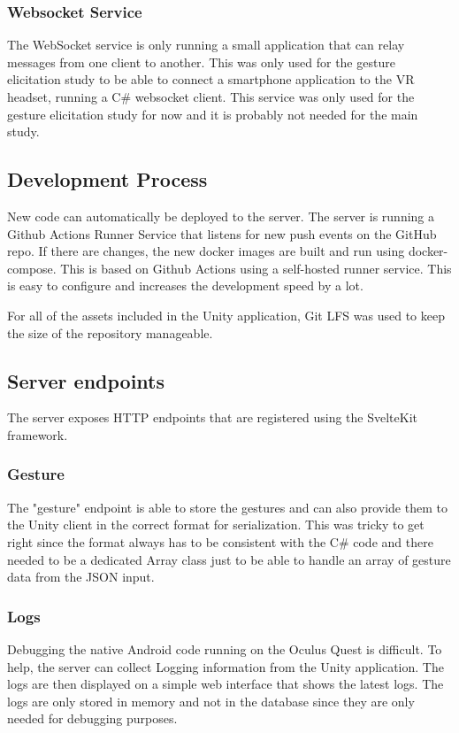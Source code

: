 \subsubsection{Websocket Service}
The WebSocket service is only running a small application that can relay messages from one client to another. This was only used for the gesture elicitation study to be able to connect a smartphone application to the VR headset, running a C\# websocket client. This service was only used for the gesture elicitation study for now and it is probably not needed for the main study.


\subsection{Development Process}
New code can automatically be deployed to the server. The server is running a Github Actions Runner Service that listens for new push events on the GitHub repo. If there are changes, the new docker images are built and run using docker-compose. This is based on Github Actions using a self-hosted runner service. This is easy to configure and increases the development speed by a lot. 

For all of the assets included in the Unity application, Git LFS was used to keep the size of the repository manageable.


\subsection{Server endpoints}
The server exposes HTTP endpoints that are registered using the SvelteKit framework.

\subsubsection{Gesture}
The "gesture" endpoint is able to store the gestures and can also provide them to the Unity client in the correct format for serialization. This was tricky to get right since the format always has to be consistent with the C\# code and there needed to be a dedicated Array class just to be able to handle an array of gesture data from the JSON input.

\subsubsection{Logs}
Debugging the native Android code running on the Oculus Quest is difficult. To help, the server can collect Logging information from the Unity application. The logs are then displayed on a simple web interface that shows the latest logs. The logs are only stored in memory and not in the database since they are only needed for debugging purposes. 


